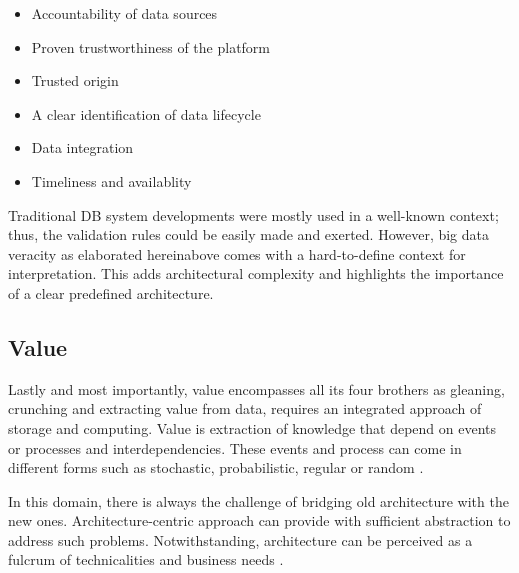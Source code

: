 \begin{itemize}
    \item Accountability of data sources
    \item Proven trustworthiness of the platform
    \item Trusted origin
    \item A clear identification of data lifecycle
    \item Data integration
    \item Timeliness and availablity
\end{itemize}

Traditional DB system developments were mostly used in a well-known context; thus, the validation rules could be easily made and exerted. However, big data veracity as elaborated hereinabove comes with a hard-to-define context for interpretation. This adds architectural complexity and highlights the importance of a clear predefined architecture.

\subsection{Value}

Lastly and most importantly, value encompasses all its four brothers as gleaning, crunching and extracting value from data, requires an integrated approach of storage and computing. Value is extraction of knowledge that depend on events or processes and interdependencies. These events and process can come in different forms such as stochastic, probabilistic, regular or random \cite{Demchenko2013}.

In this domain, there is always the challenge of bridging old architecture with the new ones. Architecture-centric approach can provide with sufficient abstraction to address such problems. Notwithstanding, architecture can be perceived as a fulcrum of technicalities and business needs \cite{Chen2016a}.

